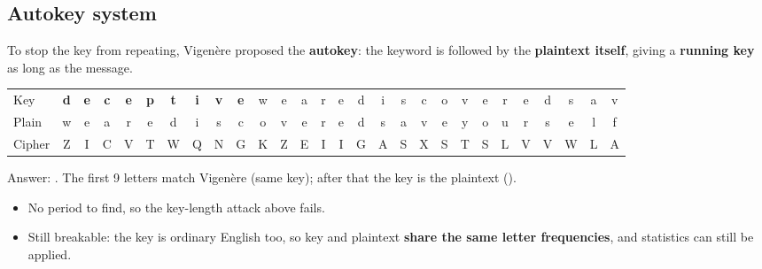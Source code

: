 \subsection{Autokey system}
To stop the key from repeating, Vigen\`ere proposed the \textbf{autokey}: the keyword is followed by the \textbf{plaintext itself}, giving a \textbf{running key} as long as the message.
\begin{center}\small\ttfamily\setlength{\tabcolsep}{2.2pt}
\begin{tabular}{@{}l*{27}{c}@{}}
\rmfamily Key & \textbf{d}&\textbf{e}&\textbf{c}&\textbf{e}&\textbf{p}&\textbf{t}&\textbf{i}&\textbf{v}&\textbf{e}&w&e&a&r&e&d&i&s&c&o&v&e&r&e&d&s&a&v\\
\rmfamily Plain & w&e&a&r&e&d&i&s&c&o&v&e&r&e&d&s&a&v&e&y&o&u&r&s&e&l&f\\
\rmfamily Cipher & Z&I&C&V&T&W&Q&N&G&K&Z&E&I&I&G&A&S&X&S&T&S&L&V&V&W&L&A
\end{tabular}
\end{center}
Answer: \textbf{}. The first 9 letters match Vigen\`ere (same key); after that the key is the plaintext ().
\begin{itemize}
  \item No period to find, so the key-length attack above fails.
  \item Still breakable: the key is ordinary English too, so key and plaintext \textbf{share the same letter frequencies}, and statistics can still be applied.
\end{itemize}

